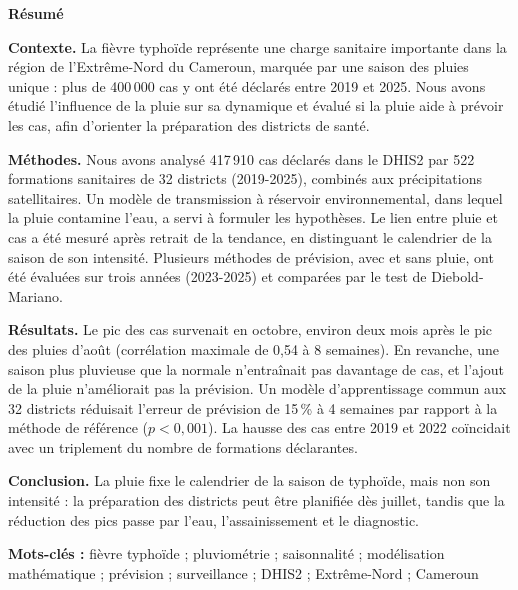 \documentclass[11pt]{article}
\begin{document}
\begin{tcolorbox}[colback=white,colframe=black,boxrule=0.5pt,arc=0pt,left=8pt,right=8pt,top=6pt,bottom=6pt,fontupper=\small]
{\sffamily\bfseries\color{navy}Résumé}\par\vspace{3pt}
\textbf{Contexte.} La fièvre typhoïde représente une charge sanitaire importante dans la région de l'Extrême-Nord du Cameroun, marquée par une saison des pluies unique : plus de 400\,000 cas y ont été déclarés entre 2019 et 2025. Nous avons étudié l'influence de la pluie sur sa dynamique et évalué si la pluie aide à prévoir les cas, afin d'orienter la préparation des districts de santé.\par
\textbf{Méthodes.} Nous avons analysé 417\,910 cas déclarés dans le DHIS2 par 522 formations sanitaires de 32 districts (2019-2025), combinés aux précipitations satellitaires. Un modèle de transmission à réservoir environnemental, dans lequel la pluie contamine l'eau, a servi à formuler les hypothèses. Le lien entre pluie et cas a été mesuré après retrait de la tendance, en distinguant le calendrier de la saison de son intensité. Plusieurs méthodes de prévision, avec et sans pluie, ont été évaluées sur trois années (2023-2025) et comparées par le test de Diebold-Mariano.\par
\textbf{Résultats.} Le pic des cas survenait en octobre, environ deux mois après le pic des pluies d'août (corrélation maximale de 0,54 à 8 semaines). En revanche, une saison plus pluvieuse que la normale n'entraînait pas davantage de cas, et l'ajout de la pluie n'améliorait pas la prévision. Un modèle d'apprentissage commun aux 32 districts réduisait l'erreur de prévision de 15\,\% à 4 semaines par rapport à la méthode de référence ($p<0{,}001$). La hausse des cas entre 2019 et 2022 coïncidait avec un triplement du nombre de formations déclarantes.\par
\textbf{Conclusion.} La pluie fixe le calendrier de la saison de typhoïde, mais non son intensité : la préparation des districts peut être planifiée dès juillet, tandis que la réduction des pics passe par l'eau, l'assainissement et le diagnostic.\par\vspace{3pt}
\textbf{Mots-clés :} fièvre typhoïde ; pluviométrie ; saisonnalité ; modélisation mathématique ; prévision ; surveillance ; DHIS2 ; Extrême-Nord ; Cameroun
\end{tcolorbox}
\end{document}

